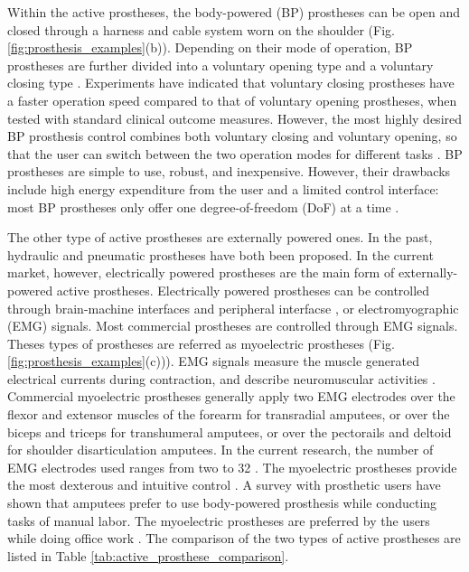 Within the active prostheses, the body-powered (BP) prostheses can be open and closed through a harness and cable system worn on the shoulder (Fig. \ref{fig:prosthesis_examples}(b)). Depending on their mode of operation, BP prostheses are further divided into a voluntary opening type and a voluntary closing type \cite{noauthor_6a:_nodate}. Experiments have indicated that voluntary closing prostheses have a faster operation speed compared to that of voluntary opening prostheses, when tested with standard clinical outcome measures. However, the most highly desired BP prosthesis control combines both voluntary closing and voluntary opening, so that the user can switch between the two operation modes for different tasks \cite{berning2014comparison}. 
BP prostheses are simple to use, robust, and inexpensive. However, their drawbacks include high energy expenditure from the user and a limited control interface: most BP prostheses only offer one degree-of-freedom  (DoF) at a time \cite{hosmer}. 

The other type of active prostheses are externally powered ones. In the past, hydraulic and pneumatic prostheses have both been proposed. In the current market, however, electrically powered prostheses are the main form of externally-powered active prostheses. Electrically powered prostheses can be controlled through brain-machine interfaces \cite{noauthor_revolutionizing_nodate, guger1999prosthetic, aggarwal2006noninvasive} and peripheral interfacse \cite{ortiz2014osseointegrated,raspopovic2014restoring,dhillon2005direct,di2012human,oddo2016intraneural,horch2011object}, or electromyographic (EMG) signals. Most commercial prostheses are controlled through EMG signals. Theses types of prostheses are referred as myoelectric prostheses (Fig. \ref{fig:prosthesis_examples}(c))). EMG signals measure the muscle generated electrical currents during contraction, and describe neuromuscular activities \cite{reaz2006techniques}. Commercial myoelectric prostheses generally apply two EMG electrodes over the flexor and extensor muscles of the forearm for transradial amputees, or over the biceps and triceps for transhumeral amputees, or over the pectorails and deltoid for shoulder disarticulation amputees. In the current research, the number of EMG electrodes used ranges from two to 32 \cite{ottobock_sensor_hand_speed, tenore2007towards}. 
The myoelectric prostheses provide the most dexterous and intuitive control \cite{cordella2016literature}. A survey with prosthetic users have shown that amputees prefer to use body-powered prosthesis while conducting tasks of manual labor. The myoelectric prostheses are preferred by the users while doing office work \cite{carey2015differences}. The comparison of the two types of active prostheses are listed in Table \ref{tab:active_prosthese_comparison}.



